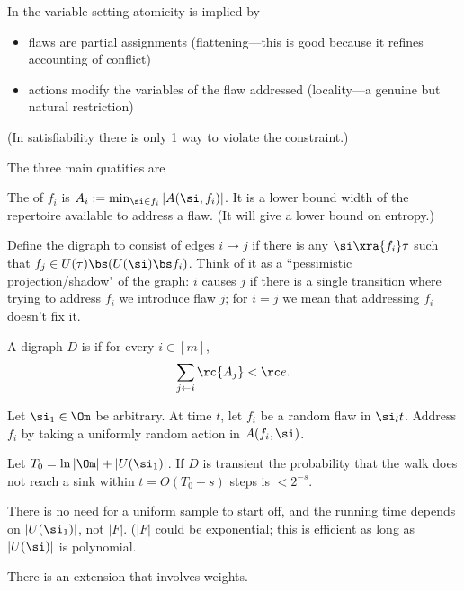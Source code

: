 In the variable setting atomicity is implied by
\begin{itemize}
\item
flaws are partial assignments (flattening---this is good because it refines accounting of conflict)
\item 
actions modify the variables of the flaw addressed (locality---a genuine but natural restriction)
\end{itemize}
(In satisfiability there is only 1 way to violate the constraint.)

The three main quatities are
\begin{df}
The  of $f_i$ is $A_i:=\min_{\si\in f_i}|A(\si,f_i)|$. It is a lower bound width of the repertoire available to address a flaw. (It will give a lower bound on entropy.)

Define the  digraph to consist of edges $i\to j$ if there is any $\si\xra{f_i}\tau$ such that $f_j\in U(\tau)\bs (U(\si)\bs f_i)$. 
Think of it as a ``pessimistic projection/shadow" of the graph: $i$ causes $j$ if there is a single transition where trying to address $f_i$ we introduce flaw $j$; for $i=j$ we mean that addressing $f_i$ doesn't fix it.

A digraph $D$ is  if for every $i\in [m]$,
\[
\sum_{j\leftarrow i}\rc{A_j}<\rc e.
\]
\end{df}

\begin{thm}
Let $\si_1\in \Om$ be arbitrary. At time $t$, let $f_i$ be a random flaw in $\si_lt$. Address $f_i$ by taking a uniformly random action in $A(f_i,\si)$.

Let $T_0=\ln |\Om|+|U(\si_1)|$. If $D$ is transient the probability that the walk does not reach a sink within $t=O(T_0+s)$ steps is $<2^{-s}$.
\end{thm}
There is no need for a uniform sample to start off, and the running time depends on $|U(\si_1)|$, not $|F|$. ($|F|$ could be exponential; this is efficient as long as $|U(\si)|$ is polynomial.

There is an extension that involves weights.

%



